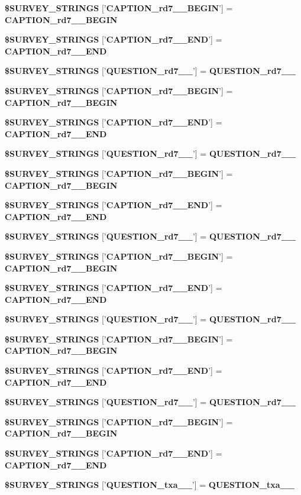 \begin{CompactItemize}
{\bf \$SURVEY\_\-STRINGS} ['{\bf CAPTION\_\-rd7\_\_\-BEGIN}'] = {\bf CAPTION\_\-rd7\_\_\-BEGIN}
\item 
{\bf \$SURVEY\_\-STRINGS} ['{\bf CAPTION\_\-rd7\_\_\-END}'] = {\bf CAPTION\_\-rd7\_\_\-END}
\item 
{\bf \$SURVEY\_\-STRINGS} ['{\bf QUESTION\_\-rd7\_\_\-}'] = {\bf QUESTION\_\-rd7\_\_\-}
\item 
{\bf \$SURVEY\_\-STRINGS} ['{\bf CAPTION\_\-rd7\_\_\-BEGIN}'] = {\bf CAPTION\_\-rd7\_\_\-BEGIN}
\item 
{\bf \$SURVEY\_\-STRINGS} ['{\bf CAPTION\_\-rd7\_\_\-END}'] = {\bf CAPTION\_\-rd7\_\_\-END}
\item 
{\bf \$SURVEY\_\-STRINGS} ['{\bf QUESTION\_\-rd7\_\_\-}'] = {\bf QUESTION\_\-rd7\_\_\-}
\item 
{\bf \$SURVEY\_\-STRINGS} ['{\bf CAPTION\_\-rd7\_\_\-BEGIN}'] = {\bf CAPTION\_\-rd7\_\_\-BEGIN}
\item 
{\bf \$SURVEY\_\-STRINGS} ['{\bf CAPTION\_\-rd7\_\_\-END}'] = {\bf CAPTION\_\-rd7\_\_\-END}
\item 
{\bf \$SURVEY\_\-STRINGS} ['{\bf QUESTION\_\-rd7\_\_\-}'] = {\bf QUESTION\_\-rd7\_\_\-}
\item 
{\bf \$SURVEY\_\-STRINGS} ['{\bf CAPTION\_\-rd7\_\_\-BEGIN}'] = {\bf CAPTION\_\-rd7\_\_\-BEGIN}
\item 
{\bf \$SURVEY\_\-STRINGS} ['{\bf CAPTION\_\-rd7\_\_\-END}'] = {\bf CAPTION\_\-rd7\_\_\-END}
\item 
{\bf \$SURVEY\_\-STRINGS} ['{\bf QUESTION\_\-rd7\_\_\-}'] = {\bf QUESTION\_\-rd7\_\_\-}
\item 
{\bf \$SURVEY\_\-STRINGS} ['{\bf CAPTION\_\-rd7\_\_\-BEGIN}'] = {\bf CAPTION\_\-rd7\_\_\-BEGIN}
\item 
{\bf \$SURVEY\_\-STRINGS} ['{\bf CAPTION\_\-rd7\_\_\-END}'] = {\bf CAPTION\_\-rd7\_\_\-END}
\item 
{\bf \$SURVEY\_\-STRINGS} ['{\bf QUESTION\_\-rd7\_\_\-}'] = {\bf QUESTION\_\-rd7\_\_\-}
\item 
{\bf \$SURVEY\_\-STRINGS} ['{\bf CAPTION\_\-rd7\_\_\-BEGIN}'] = {\bf CAPTION\_\-rd7\_\_\-BEGIN}
\item 
{\bf \$SURVEY\_\-STRINGS} ['{\bf CAPTION\_\-rd7\_\_\-END}'] = {\bf CAPTION\_\-rd7\_\_\-END}
\item 
{\bf \$SURVEY\_\-STRINGS} ['{\bf QUESTION\_\-txa\_\_\-}'] = {\bf QUESTION\_\-txa\_\_\-}
\item 

\end{CompactItemize}
